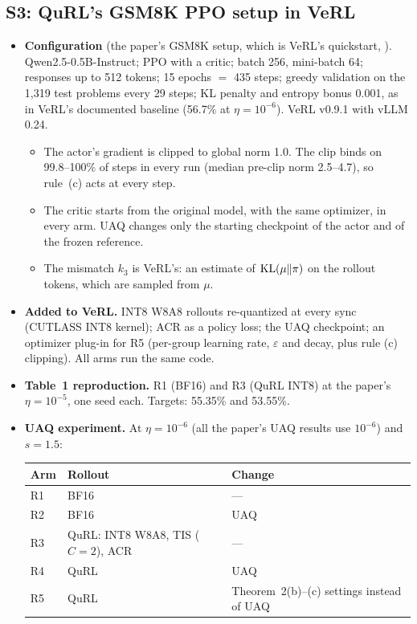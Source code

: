 \documentclass[11pt]{article}
\begin{document}
\subsection{S3: QuRL's GSM8K PPO setup in VeRL}\label{sec:s3}
\begin{itemize}
\item \textbf{Configuration} (the paper's GSM8K setup, which is VeRL's quickstart, \citealp{sheng2025hybridflow}). Qwen2.5-0.5B-Instruct; PPO with a critic; batch 256, mini-batch 64; responses up to 512 tokens; 15 epochs $=$ 435 steps; greedy validation on the 1{,}319 test problems \citep{cobbe2021gsm8k} every 29 steps; KL penalty and entropy bonus 0.001, as in VeRL's documented baseline (56.7\% at $\eta=10^{-6}$). VeRL v0.9.1 with vLLM 0.24.
  \begin{itemize}
  \item The actor's gradient is clipped to global norm 1.0. The clip binds on 99.8--100\% of steps in every run (median pre-clip norm 2.5--4.7), so rule~(c) acts at every step.
  \item The critic starts from the original model, with the same optimizer, in every arm. UAQ changes only the starting checkpoint of the actor and of the frozen reference.
  \item The mismatch $k_3$ is VeRL's: an estimate of $\mathrm{KL}(\mu\|\pi)$ on the rollout tokens, which are sampled from $\mu$.
  \end{itemize}
\item \textbf{Added to VeRL.} INT8 W8A8 rollouts re-quantized at every sync (CUTLASS INT8 kernel); ACR as a policy loss; the UAQ checkpoint; an optimizer plug-in for R5 (per-group learning rate, $\varepsilon$ and decay, plus rule (c) clipping). All arms run the same code.
\item \textbf{Table~1 reproduction.} R1 (BF16) and R3 (QuRL INT8) at the paper's $\eta=10^{-5}$, one seed each. Targets: 55.35\% and 53.55\%.
\item \textbf{UAQ experiment.} At $\eta=10^{-6}$ (all the paper's UAQ results use $10^{-6}$) and $s=1.5$:
\begin{center}\small
\begin{tabular}{@{}lll@{}}
\toprule
Arm & Rollout & Change\\
\midrule
R1 & BF16 & ---\\
R2 & BF16 & UAQ\\
R3 & QuRL: INT8 W8A8, TIS ($C=2$), ACR & ---\\
R4 & QuRL & UAQ\\
R5 & QuRL & Theorem~2(b)--(c) settings instead of UAQ\\

\end{tabular}
\end{center}
\end{itemize}
\end{document}
